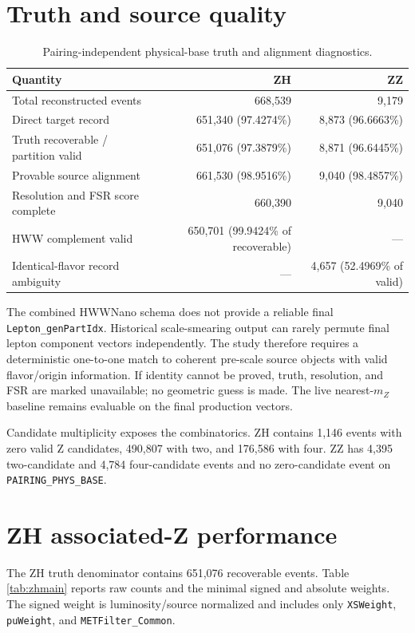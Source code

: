 \documentclass[11pt]{article}
\newcommand{\mZ}{m_{Z}}
\newcommand{\physbase}{\texttt{PAIRING\_PHYS\_BASE}}
\begin{document}
\section{Truth and source quality}

\begin{table}[htbp]
\centering
\caption{Pairing-independent physical-base truth and alignment diagnostics.}
\begin{tabular}{l rr}
\toprule
Quantity & ZH & ZZ \\
\midrule
Total reconstructed events & 668,539 & 9,179 \\
Direct target record & 651,340 (97.4274\%) & 8,873 (96.6663\%) \\
Truth recoverable / partition valid & 651,076 (97.3879\%) & 8,871 (96.6445\%) \\
Provable source alignment & 661,530 (98.9516\%) & 9,040 (98.4857\%) \\
Resolution and FSR score complete & 660,390 & 9,040 \\
HWW complement valid & 650,701 (99.9424\% of recoverable) & --- \\
Identical-flavor record ambiguity & --- & 4,657 (52.4969\% of valid) \\
\bottomrule
\end{tabular}
\end{table}

The combined HWWNano schema does not provide a reliable final
\texttt{Lepton\_genPartIdx}.  Historical scale-smearing output can rarely
permute final lepton component vectors independently.  The study therefore
requires a deterministic one-to-one match to coherent pre-scale source objects
with valid flavor/origin information.  If identity cannot be proved, truth,
resolution, and FSR are marked unavailable; no geometric guess is made.  The
live nearest-$\mZ$ baseline remains evaluable on the final production vectors.

Candidate multiplicity exposes the combinatorics.  ZH contains 1,146 events
with zero valid Z candidates, 490,807 with two, and 176,586 with four.  ZZ has
4,395 two-candidate and 4,784 four-candidate events and no zero-candidate event
on \physbase.

\section{ZH associated-Z performance}

The ZH truth denominator contains 651,076 recoverable events.  Table
\ref{tab:zhmain} reports raw counts and the minimal signed and absolute weights.
The signed weight is luminosity/source normalized and includes only
\texttt{XSWeight}, \texttt{puWeight}, and \texttt{METFilter\_Common}.
\end{document}

